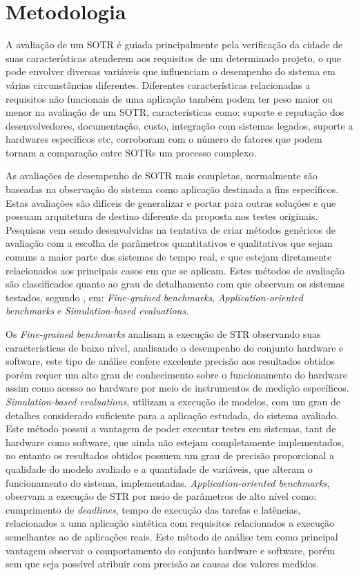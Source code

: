 \chapter{Metodologia}
\label{cap:projeto}

A avaliação de um SOTR é guiada principalmente pela verificação da cidade de suas características atenderem aos requisitos de um determinado projeto, o que pode envolver diversas variáveis que influenciam o desempenho do sistema em várias circunstâncias diferentes. Diferentes características relacionadas a requisitos não funcionais de uma aplicação também  podem ter peso maior ou menor na avaliação de um SOTR, características como: suporte e reputação dos desenvolvedores, documentação, custo, integração com sistemas legados, suporte a hardwares específicos etc, corroboram com o número de fatores que podem tornam a comparação entre SOTRs um processo complexo.

As avaliações de desempenho de SOTR  mais completas, normalmente são baseadas na observação do sistema como aplicação destinada a fins específicos. Estas avaliações são difíceis de generalizar e portar para outras soluções e que possuam arquitetura de destino diferente da proposta nos testes originais. Pesquisas vem sendo desenvolvidas na tentativa de criar métodos genéricos de avaliação com a escolha de parâmetros quantitativos e qualitativos que sejam comuns a maior parte dos sistemas de tempo real, e que estejam diretamente relacionados aos principais casos em que se aplicam. Estes métodos de avaliação são classificados quanto ao grau de detalhamento com que observam os sistemas testados, segundo \cite{Ghosh1994}, em: \textit{Fine-grained benchmarks}, \textit{Application-oriented benchmarks} e \textit{Simulation-based evaluations}.

Os \textit{Fine-grained benchmarks} analisam a execução de STR observando suas características de baixo nível, analisando o desempenho do conjunto hardware e software, este tipo de análise confere excelente precisão aos resultados obtidos porém requer um alto grau de conhecimento sobre o funcionamento do hardware assim como acesso ao hardware por meio de instrumentos de medição específicos. \textit{Simulation-based evaluations}, utilizam a execução de modelos, com um grau de detalhes considerado suficiente para a aplicação estudada, do sistema avaliado. Este método possui a vantagem de poder executar testes em sistemas, tant de hardware como software, que ainda não estejam completamente implementados, no entanto os resultados obtidos possuem um grau de precisão proporcional a qualidade do modelo avaliado e a quantidade de variáveis, que alteram o funcionamento do sistema, implementadas. \textit{Application-oriented benchmarks}, observam a execução de STR por meio de parâmetros de alto nível como: cumprimento de \textit{deadlines}, tempo de execução das tarefas e latências, relacionados a uma aplicação sintética com requisitos relacionados a execução semelhantes ao de aplicações reais. Este método de análise tem como principal vantagem observar o comportamento do conjunto hardware e software, porém sem que seja possível atribuir com precisão as causas dos valores medidos.

